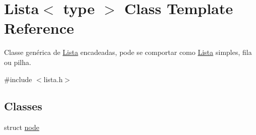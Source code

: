 \hypertarget{classLista}{\section{Lista$<$ type $>$ Class Template Reference}
\label{classLista}
}


Classe genérica de \hyperlink{classLista}{Lista} encadeadas, pode se comportar como \hyperlink{classLista}{Lista} simples, fila ou pilha.  




{\ttfamily \#include $<$lista.\+h$>$}

\subsection*{Classes}
\begin{DoxyCompactItemize}
\item 
struct \hyperlink{structLista_1_1node}{node}
\end{DoxyCompactItemize}
